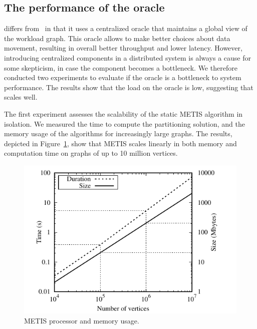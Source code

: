 
\subsection{The performance of the oracle}

\dynastar differs from \dssmr\ in that it uses a centralized oracle
that maintains a global view of the workload graph. This oracle allows
\dynastar to make better choices about data movement, resulting in overall
better throughput and lower latency. However, introducing centralized
components in a distributed system is always a cause for some skepticism,
in case the component becomes a bottleneck. We therefore conducted two
experiments to evaluate if the \dynastar oracle is a bottleneck to
system performance. The results show that the load on the oracle is
low, suggesting that \dynastar scales well.


The first experiment assesses the scalability of the static METIS algorithm
in isolation. We measured the time to compute the partitioning solution, and
the memory usage of the algorithms for increasingly large graphs. 
The results, depicted in Figure~\ref{fig:metis_size_time}, show that METIS scales
linearly in both memory and computation time on graphs of up to 10 million vertices.

\begin{figure}[ht!]
  \centering
    \includegraphics[width=\columnwidth]{figures/metis_size_time}
	\caption{METIS processor and memory usage.}
	\label{fig:metis_size_time}
\end{figure}

